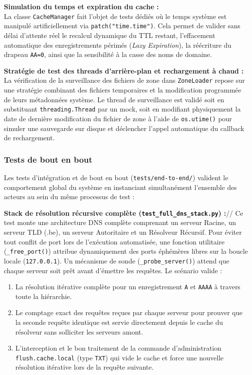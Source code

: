 \textbf{Simulation du temps et expiration du cache :}\\
La classe \texttt{CacheManager} fait l'objet de tests dédiés où le temps système est manipulé artificiellement via \texttt{patch("time.time")}. Cela permet de valider sans délai d'attente réel le recalcul dynamique du TTL restant, l'effacement automatique des enregistrements périmés (\textit{Lazy Expiration}), la réécriture du drapeau \texttt{AA=0}, ainsi que la sensibilité à la casse des noms de domaine.

\textbf{Stratégie de test des threads d'arrière-plan et rechargement à chaud :}\\
La vérification de la surveillance des fichiers de zone dans \texttt{ZoneLoader} repose sur une stratégie combinant des fichiers temporaires et la modification programmée de leurs métadonnées système. Le thread de surveillance est validé soit en substituant \texttt{threading.Thread} par un mock, soit en modifiant physiquement la date de dernière modification du fichier de zone à l'aide de \texttt{os.utime()} pour simuler une sauvegarde sur disque et déclencher l'appel automatique du callback de rechargement.


\subsubsection{Tests de bout en bout}
Les tests d'intégration et de bout en bout (\texttt{tests/end-to-end/}) valident le comportement global du système en instanciant simultanément l'ensemble des acteurs au sein du même processus de test :

\textbf{Stack de résolution récursive complète (\texttt{test\_full\_dns\_stack.py}) :}//
Ce test monte une architecture DNS complète comprenant un serveur Racine, un serveur TLD (.be), un serveur Autoritaire et un Résolveur Récursif. Pour éviter tout conflit de port lors de l'exécution automatisée, une fonction utilitaire (\texttt{\_free\_port()}) attribue dynamiquement des ports éphémères libres sur la boucle locale (\texttt{127.0.0.1}). Un mécanisme de sonde (\texttt{\_probe\_server()}) attend que chaque serveur soit prêt avant d'émettre les requêtes. Le scénario valide :
\begin{enumerate}
    \item La résolution itérative complète pour un enregistrement \texttt{A} et \texttt{AAAA} à travers toute la hiérarchie.
    \item Le comptage exact des requêtes reçues par chaque serveur pour prouver que la seconde requête identique est servie directement depuis le cache du résolveur sans solliciter les serveurs amont.
    \item L'interception et le bon traitement de la commande d'administration \texttt{flush.cache.local} (type \texttt{TXT}) qui vide le cache et force une nouvelle résolution itérative lors de la requête suivante.
\end{enumerate}

